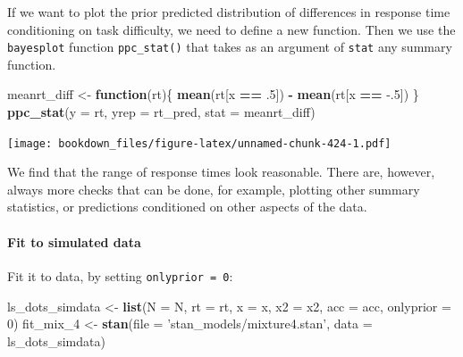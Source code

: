\documentclass[12pt,]{krantz}
\newenvironment{Shaded}{\begin{snugshade}}{\end{snugshade}}
\newcommand{\ControlFlowTok}[1]{\textcolor[rgb]{0.13,0.29,0.53}{\textbf{#1}}}
\newcommand{\DataTypeTok}[1]{\textcolor[rgb]{0.13,0.29,0.53}{#1}}
\newcommand{\DecValTok}[1]{\textcolor[rgb]{0.00,0.00,0.81}{#1}}
\newcommand{\FloatTok}[1]{\textcolor[rgb]{0.00,0.00,0.81}{#1}}
\newcommand{\KeywordTok}[1]{\textcolor[rgb]{0.13,0.29,0.53}{\textbf{#1}}}
\newcommand{\NormalTok}[1]{#1}
\newcommand{\OperatorTok}[1]{\textcolor[rgb]{0.81,0.36,0.00}{\textbf{#1}}}
\newcommand{\StringTok}[1]{\textcolor[rgb]{0.31,0.60,0.02}{#1}}
\let\oldparagraph\paragraph
\renewcommand{\paragraph}[1]{\oldparagraph{#1}\mbox{}}
\theoremstyle{definition}
\theoremstyle{definition}
\theoremstyle{definition}
\theoremstyle{remark}
\begin{document}
If we want to plot the prior predicted distribution of differences in response time conditioning on task difficulty, we need to define a new function. Then we use the \texttt{bayesplot} function \texttt{ppc\_stat()} that takes as an argument of \texttt{stat} any summary function.

\begin{Shaded}
\begin{Highlighting}[]
\NormalTok{meanrt_diff <-}\StringTok{ }\ControlFlowTok{function}\NormalTok{(rt)\{}
  \KeywordTok{mean}\NormalTok{(rt[x }\OperatorTok{==}\StringTok{ }\FloatTok{.5}\NormalTok{]) }\OperatorTok{-}\StringTok{ }\KeywordTok{mean}\NormalTok{(rt[x }\OperatorTok{==}\StringTok{ }\FloatTok{-.5}\NormalTok{])}
\NormalTok{\} }
\KeywordTok{ppc_stat}\NormalTok{(}\DataTypeTok{y =}\NormalTok{ rt, }\DataTypeTok{yrep =}\NormalTok{ rt_pred, }\DataTypeTok{stat =}\NormalTok{ meanrt_diff) }
\end{Highlighting}
\end{Shaded}

\texttt{[image: bookdown\_files/figure-latex/unnamed-chunk-424-1.pdf]}

We find that the range of response times look reasonable. There are, however, always more checks that can be done, for example, plotting other summary statistics, or predictions conditioned on other aspects of the data.

\hypertarget{fit-to-simulated-data}{%
\paragraph{Fit to simulated data}\label{fit-to-simulated-data}}

Fit it to data, by setting \texttt{onlyprior\ =\ 0}:

\begin{Shaded}
\begin{Highlighting}[]
\NormalTok{ls_dots_simdata <-}\StringTok{ }\KeywordTok{list}\NormalTok{(}\DataTypeTok{N =}\NormalTok{ N,}
                        \DataTypeTok{rt =}\NormalTok{ rt,}
                        \DataTypeTok{x =}\NormalTok{ x,}
                        \DataTypeTok{x2 =}\NormalTok{ x2,}
                        \DataTypeTok{acc =}\NormalTok{ acc,}
                        \DataTypeTok{onlyprior =} \DecValTok{0}\NormalTok{) }
\NormalTok{fit_mix_}\DecValTok{4}\NormalTok{ <-}\StringTok{ }\KeywordTok{stan}\NormalTok{(}\DataTypeTok{file =} \StringTok{'stan_models/mixture4.stan'}\NormalTok{,}
                  \DataTypeTok{data =}\NormalTok{ ls_dots_simdata)  }
\end{Highlighting}
\end{Shaded}
\end{document}
